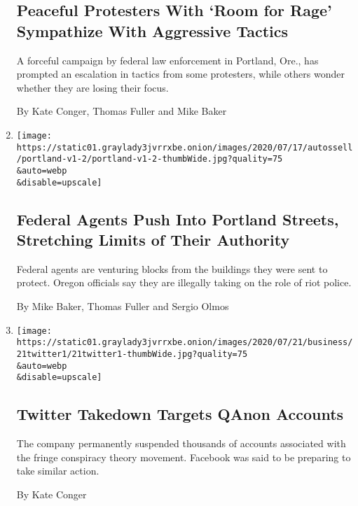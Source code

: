 \begin{enumerate}
{  \subsection{Peaceful Protesters With `Room for Rage' Sympathize With
  Aggressive
  Tactics}\label{peaceful-protesters-with-room-for-rage-sympathize-with-aggressive-tactics}}

  A forceful campaign by federal law enforcement in Portland, Ore., has
  prompted an escalation in tactics from some protesters, while others
  wonder whether they are losing their focus.

  By Kate Conger, Thomas Fuller and Mike Baker
\item
  \href{/2020/07/25/us/portland-federal-legal-jurisdiction-courts.html}{}

  \texttt{[image: https://static01.graylady3jvrrxbe.onion/images/2020/07/17/autossell/portland-v1-2/portland-v1-2-thumbWide.jpg?quality=75\\\&auto=webp\\\&disable=upscale]}

  \hypertarget{federal-agents-push-into-portland-streets-stretching-limits-of-their-authority}{%
  \subsection{Federal Agents Push Into Portland Streets, Stretching
  Limits of Their
  Authority}\label{federal-agents-push-into-portland-streets-stretching-limits-of-their-authority}}

  Federal agents are venturing blocks from the buildings they were sent
  to protect. Oregon officials say they are illegally taking on the role
  of riot police.

  By Mike Baker, Thomas Fuller and Sergio Olmos
\item
  \href{/2020/07/21/technology/twitter-bans-qanon-accounts.html}{}

  \texttt{[image: https://static01.graylady3jvrrxbe.onion/images/2020/07/21/business/21twitter1/21twitter1-thumbWide.jpg?quality=75\\\&auto=webp\\\&disable=upscale]}

  \hypertarget{twitter-takedown-targets-qanon-accounts}{%
  \subsection{Twitter Takedown Targets QAnon
  Accounts}\label{twitter-takedown-targets-qanon-accounts}}

  The company permanently suspended thousands of accounts associated
  with the fringe conspiracy theory movement. Facebook was said to be
  preparing to take similar action.

  By Kate Conger
\end{enumerate}

